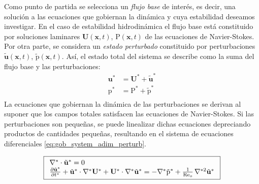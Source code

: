 Como punto de partida se selecciona un \textit{flujo base} de interés, es decir, una solución a las ecuaciones que gobiernan la dinámica y cuya estabilidad deseamos investigar. En el caso de estabilidad hidrodinámica el flujo base está constituido por soluciones laminares $\mathbf{U}(\mathbf{x},t)$, $\text{P}(\mathbf{x},t)$ de las ecuaciones de Navier-Stokes. Por otra parte, se considera un \textit{estado perturbado} constituido por perturbaciones $\tilde{\mathbf{u}}(\mathbf{x},t)$, $\tilde{\text{p}}(\mathbf{x},t)$. Así, el estado total del sistema se describe como la suma del flujo base y las perturbaciones: 
\begin{align}
\mathbf{u^*} &= \mathbf{U^*} + \tilde{\mathbf{u}}^* \\
\text{p}^* &= \text{P}^*+ \tilde{\text{p}}^* \\
\end{align}
La ecuaciones que gobiernan la dinámica de las perturbaciones se derivan al suponer que los campos totales satisfacen las ecuaciones de Navier-Stokes. Si las perturbaciones son pequeñas, se puede linealizar dichas ecuaciones depreciando productos de cantidades pequeñas, resultando en el sistema de ecuaciones diferenciales \ref{eq:gob_system_adim_perturb}.   

\begin{equation}
\boxed{
\begin{array}{l}
    \nabla^* \cdot \tilde{\mathbf{u}}^* = 0 \\
    \frac{\partial \tilde{\mathbf{u}}^*}{\partial t^*} + \tilde{\mathbf{u}}^* \cdot \nabla^* \mathbf{U^*} + \mathbf{U^*} \cdot \nabla^*  \tilde{\mathbf{u}}^* = 
    -\nabla^* \tilde{\text{p}}^* + \frac{1}{\text{Re}_o} \hspace{0.5mm} \nabla^{*2} \tilde{\mathbf{u}}^* \\

\end{array}
}
\label{eq:gob_system_adim_perturb}
\end{equation} 






